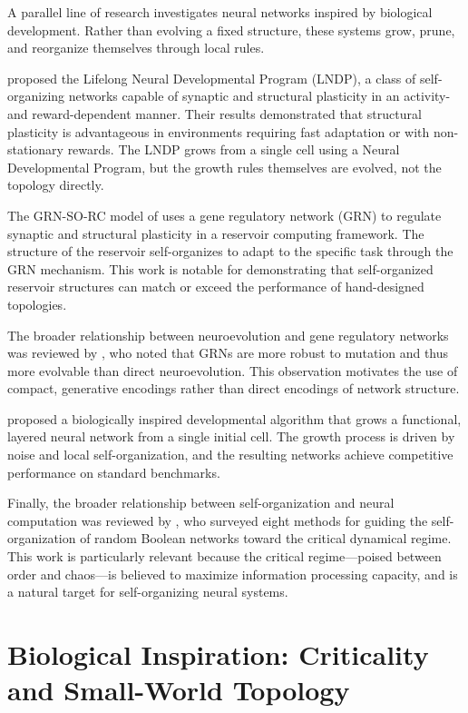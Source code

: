 A parallel line of research investigates neural networks inspired by
biological development. Rather than evolving a fixed structure, these systems
grow, prune, and reorganize themselves through local rules.

\citet{plantec2024evolving} proposed the Lifelong Neural Developmental Program
(LNDP), a class of self-organizing networks capable of synaptic and structural
plasticity in an activity- and reward-dependent manner. Their results
demonstrated that structural plasticity is advantageous in environments
requiring fast adaptation or with non-stationary rewards. The LNDP grows from
a single cell using a Neural Developmental Program, but the growth rules
themselves are evolved, not the topology directly.

The GRN-SO-RC model of \citet{hajizada2024developmental} uses a gene regulatory
network (GRN) to regulate synaptic and structural plasticity in a reservoir
computing framework. The structure of the reservoir self-organizes to adapt to
the specific task through the GRN mechanism. This work is notable for
demonstrating that self-organized reservoir structures can match or exceed the
performance of hand-designed topologies.

The broader relationship between neuroevolution and gene regulatory networks
was reviewed by \citet{2025neuroevolution}, who noted that GRNs are more robust
to mutation and thus more evolvable than direct neuroevolution. This
observation motivates the use of compact, generative encodings rather than
direct encodings of network structure.

\citet{hazan2024self} proposed a biologically inspired developmental algorithm
that grows a functional, layered neural network from a single initial cell.
The growth process is driven by noise and local self-organization, and the
resulting networks achieve competitive performance on standard benchmarks.

Finally, the broader relationship between self-organization and neural
computation was reviewed by \citet{gershenson2010guiding}, who surveyed eight
methods for guiding the self-organization of random Boolean networks toward
the critical dynamical regime. This work is particularly relevant because the
critical regime—poised between order and chaos—is believed to maximize
information processing capacity, and is a natural target for self-organizing
neural systems.

\section{Biological Inspiration: Criticality and Small-World Topology}
\label{sec:bio}

